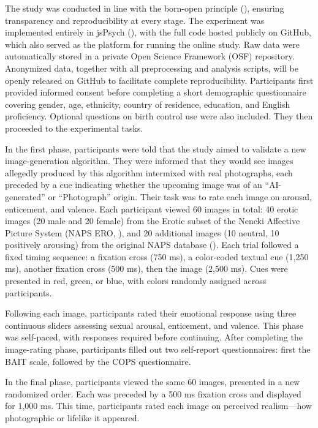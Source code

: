 \documentclass[
  jou,
  floatsintext,
  longtable,
  nolmodern,
  notxfonts,
  notimes,
  colorlinks=true,linkcolor=blue,citecolor=blue,urlcolor=blue]{apa7}
\begin{document}
The study was conducted in line with the born-open principle
(), ensuring transparency and
reproducibility at every stage. The experiment was implemented entirely
in jsPsych (), with the full
code hosted publicly on GitHub, which also served as the platform for
running the online study. Raw data were automatically stored in a
private Open Science Framework (OSF) repository. Anonymized data,
together with all preprocessing and analysis scripts, will be openly
released on GitHub to facilitate complete reproducibility. Participants
first provided informed consent before completing a short demographic
questionnaire covering gender, age, ethnicity, country of residence,
education, and English proficiency. Optional questions on birth control
use were also included. They then proceeded to the experimental tasks.

In the first phase, participants were told that the study aimed to
validate a new image-generation algorithm. They were informed that they
would see images allegedly produced by this algorithm intermixed with
real photographs, each preceded by a cue indicating whether the upcoming
image was of an ``AI-generated'' or ``Photograph'' origin. Their task
was to rate each image on arousal, enticement, and valence. Each
participant viewed 60 images in total: 40 erotic images (20 male and 20
female) from the Erotic subset of the Nencki Affective Picture System
(NAPS ERO, ), and
20 additional images (10 neutral, 10 positively arousing) from the
original NAPS database (). Each trial followed a fixed timing sequence: a fixation
cross (750 ms), a color-coded textual cue (1,250 ms), another fixation
cross (500 ms), then the image (2,500 ms). Cues were presented in red,
green, or blue, with colors randomly assigned across participants.

Following each image, participants rated their emotional response using
three continuous sliders assessing sexual arousal, enticement, and
valence. This phase was self-paced, with responses required before
continuing. After completing the image-rating phase, participants filled
out two self-report questionnaires: first the BAIT scale, followed by
the COPS questionnaire.

In the final phase, participants viewed the same 60 images, presented in
a new randomized order. Each was preceded by a 500 ms fixation cross and
displayed for 1,000 ms. This time, participants rated each image on
perceived realism---how photographic or lifelike it appeared.
\end{document}
